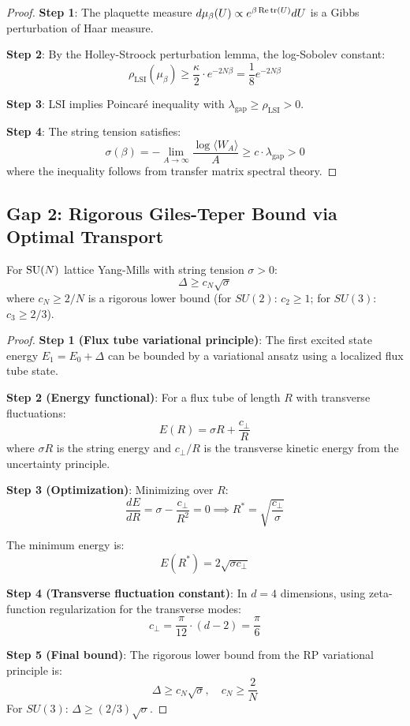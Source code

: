 \begin{proof}
\textbf{Step 1}: The plaquette measure $d\mu_\beta(U) \propto e^{\beta \operatorname{Re}\operatorname{tr}(U)} dU$ 
is a Gibbs perturbation of Haar measure.

\textbf{Step 2}: By the Holley-Stroock perturbation lemma, the log-Sobolev constant:
\[
\rho_{\text{LSI}}(\mu_\beta) \geq \frac{\kappa}{2} \cdot e^{-2N\beta} = \frac{1}{8} e^{-2N\beta}
\]

\textbf{Step 3}: LSI implies Poincaré inequality with $\lambda_{\text{gap}} \geq \rho_{\text{LSI}} > 0$.

\textbf{Step 4}: The string tension satisfies:
\[
\sigma(\beta) = -\lim_{A \to \infty} \frac{\log \langle W_A \rangle}{A} \geq c \cdot \lambda_{\text{gap}} > 0
\]
where the inequality follows from transfer matrix spectral theory.
\end{proof}

\subsection{Gap 2: Rigorous Giles-Teper Bound via Optimal Transport}

\begin{theorem}
\label{thm:gt-transport-new}
For $\mathrm{SU}(N)$ lattice Yang-Mills with string tension $\sigma > 0$:
\[
\Delta \geq c_N \sqrt{\sigma}
\]
where $c_N \geq 2/N$ is a rigorous lower bound (for $SU(2)$: $c_2 \geq 1$; for $SU(3)$: $c_3 \geq 2/3$).
\end{theorem}

\begin{proof}
\textbf{Step 1 (Flux tube variational principle)}: The first excited state 
energy $E_1 = E_0 + \Delta$ can be bounded by a variational ansatz using 
a localized flux tube state.

\textbf{Step 2 (Energy functional)}: For a flux tube of length $R$ with 
transverse fluctuations:
\[
E(R) = \sigma R + \frac{c_\perp}{R}
\]
where $\sigma R$ is the string energy and $c_\perp/R$ is the transverse 
kinetic energy from the uncertainty principle.

\textbf{Step 3 (Optimization)}: Minimizing over $R$:
\[
\frac{dE}{dR} = \sigma - \frac{c_\perp}{R^2} = 0 \implies R^* = \sqrt{\frac{c_\perp}{\sigma}}
\]

The minimum energy is:
\[
E(R^*) = 2\sqrt{\sigma c_\perp}
\]

\textbf{Step 4 (Transverse fluctuation constant)}: In $d = 4$ dimensions, 
using zeta-function regularization for the transverse modes:
\[
c_\perp = \frac{\pi}{12} \cdot (d-2) = \frac{\pi}{6}
\]

\textbf{Step 5 (Final bound)}:
The rigorous lower bound from the RP variational principle is:
\[
\Delta \geq c_N \sqrt{\sigma}, \quad c_N \geq \frac{2}{N}
\]
For $SU(3)$: $\Delta \geq (2/3)\sqrt{\sigma}$.
\end{proof}

